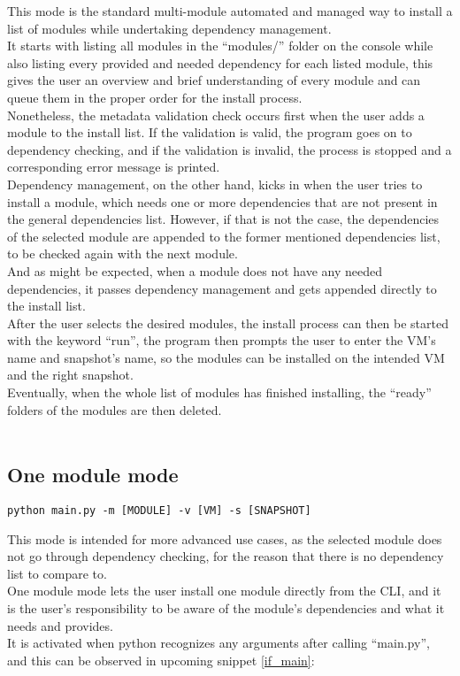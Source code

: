 This mode is the standard multi-module automated and managed way to install a list of modules while undertaking dependency management.\\
It starts with listing all modules in the “modules/” folder on the console while also listing every provided and needed dependency for each listed module, this gives the user an overview and brief understanding of every module and can queue them in the proper order for the install process.\\
Nonetheless, the metadata validation check occurs first when the user adds a module to the install list. If the validation is valid, the program goes on to dependency checking, and if the validation is invalid, the process is stopped and a corresponding error message is printed.\\
Dependency management, on the other hand, kicks in when the user tries to install a module, which needs one or more dependencies that are not present in the general dependencies list.
However, if that is not the case, the dependencies of the selected module are appended to the former mentioned dependencies list, to be checked again with the next module.\\
And as might be expected, when a module does not have any needed dependencies, it passes dependency management and gets appended directly to the install list.\\
After the user selects the desired modules, the install process can then be started with the keyword “run”, the program then prompts the user to enter the VM’s name and snapshot’s name, so the modules can be installed on the intended VM and the right snapshot.\\
Eventually, when the whole list of modules has finished installing, the “ready” folders of the modules are then deleted.
\\
\\

\subsection{One module mode}
\begin{lstlisting}[caption=One module command, style=pythonstyle]
python main.py -m [MODULE] -v [VM] -s [SNAPSHOT]
\end{lstlisting}

This mode is intended for more advanced use cases, as the selected module does not go through dependency checking, for the reason that there is no dependency list to compare to.\\
One module mode lets the user install one module directly from the CLI, and it is the user’s responsibility to be aware of the module’s dependencies and what it needs and provides.\\
It is activated when python recognizes any arguments after calling “main.py”, and this can be observed in upcoming snippet \ref{if_main}:

